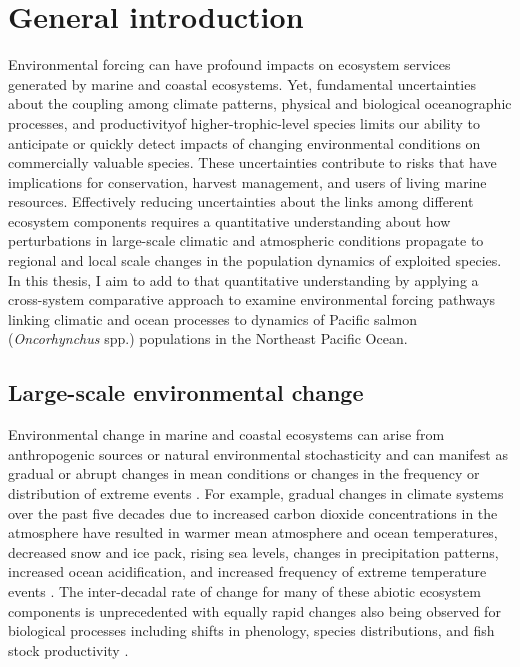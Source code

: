 
\chapter[General introduction]{General introduction}
\label{ch:intro}

Environmental forcing can have profound impacts on ecosystem services generated
by marine and coastal ecosystems. Yet, fundamental uncertainties about the
coupling among climate patterns, physical and biological oceanographic
processes, and productivity\footnotemark[1] of higher-trophic-level species
limits our ability to anticipate or quickly detect impacts of changing
environmental conditions on commercially valuable species. These uncertainties
contribute to risks that have implications for conservation, harvest management,
and users of living marine resources. Effectively reducing uncertainties about
the links among different ecosystem components requires a quantitative
understanding about how perturbations in large-scale climatic and atmospheric
conditions propagate to regional and local scale changes in the population
dynamics of exploited species. In this thesis, I aim to add to that quantitative
understanding by applying a cross-system comparative approach to examine
environmental forcing pathways linking climatic and ocean processes to dynamics
of Pacific salmon (\emph{Oncorhynchus} spp.) populations in the Northeast
Pacific Ocean.



\section{Large-scale environmental change}

Environmental change in marine and coastal ecosystems can arise from
anthropogenic sources or natural environmental stochasticity and can manifest as
gradual or abrupt changes in mean conditions or changes in the frequency or
distribution of extreme events \citep{Jentsch2007}. For example, gradual changes
in climate systems over the past five decades due to increased carbon dioxide
concentrations in the atmosphere have resulted in warmer mean atmosphere and
ocean temperatures, decreased snow and ice pack, rising sea levels, changes in
precipitation patterns, increased ocean acidification, and increased frequency
of extreme temperature events \citep{IPCC2013a}. The inter-decadal rate of
change for many of these abiotic ecosystem components is unprecedented with
equally rapid changes also being observed for biological processes including
shifts in phenology, species distributions, and fish stock productivity
\citep{IPCC2013a, Taylor2008a, Pinsky2013, Peterman2012}.

